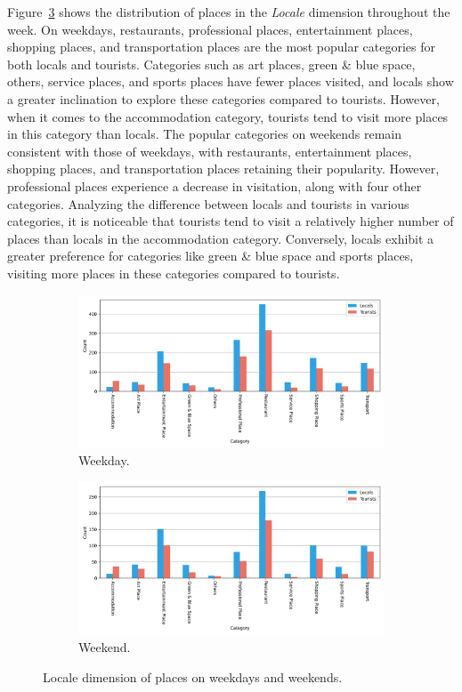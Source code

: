 \documentclass{article}
\theoremstyle{definition}
\theoremstyle{remark}
\begin{document}
Figure~\ref{fig:places_locale_week} shows the distribution of places in the \textit{Locale} dimension throughout the week. On weekdays, restaurants, professional places, entertainment places, shopping places, and transportation places are the most popular categories for both locals and tourists. Categories such as art places, green \& blue space, others, service places, and sports places have fewer places visited, and locals show a greater inclination to explore these categories compared to tourists. However, when it comes to the accommodation category, tourists tend to visit more places in this category than locals. The popular categories on weekends remain consistent with those of weekdays, with restaurants, entertainment places, shopping places, and transportation places retaining their popularity. However, professional places experience a decrease in visitation, along with four other categories. Analyzing the difference between locals and tourists in various categories, it is noticeable that tourists tend to visit a relatively higher number of places than locals in the accommodation category. Conversely, locals exhibit a greater preference for categories like green \& blue space and sports places, visiting more places in these categories compared to tourists.


\begin{figure}[!h]

\centering
\begin{subfigure}{0.6\textheight}
\centering
\includegraphics[width=0.9\linewidth]{figures/places_locale_weekday.png}
\caption{Weekday.}
\label{fig:places_locale_weekday}
\end{subfigure}
\begin{subfigure}{0.6\textheight}
\centering
\includegraphics[width=0.9\linewidth]{figures/places_locale_weekend.png}
\caption{Weekend.}
\label{fig:places_locale_weekend}
\end{subfigure}

\caption{Locale dimension of places on weekdays and weekends.}
\label{fig:places_locale_week}
\end{figure}
\end{document}
